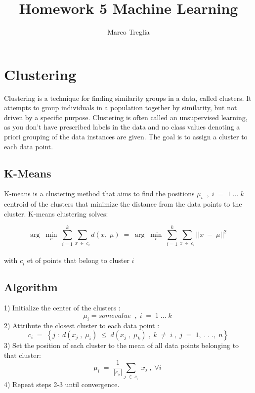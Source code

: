 \documentclass[11pt]{article}
\theoremstyle{plain}
\begin{document}
 



\title{Homework 5 Machine Learning}
\date{}
\author{Marco Treglia}
\maketitle

\section{Clustering }
Clustering is a technique for finding similarity groups in a data, called clusters. It attempts to group individuals in a population together by similarity, but not driven by a specific purpose. Clustering is often called an unsupervised learning, as you don’t have prescribed labels in the data and no class values denoting a priori grouping of the data instances are given.  The goal is to assign a cluster to each data point.
\\
\subsection{K-Means}
 K-means is a clustering method that aims to find the positions $\mu _{i}\; \; ,\; i\; =\; 1\; ...\; k\;  $ centroid of the clusters that minimize the distance from the data points to the cluster. K-means clustering solves:

$$ \arg \; \min _{c}\; \sum_{i=1}^{k}{\sum_{x\; \in \; c_{i}}^{}{d\left( x,\; \mu  \right)\; =\; }}\arg \; \min _{c}\; \sum_{i=1}^{k}{\sum_{x\; \in \; c_{i}}^{}{\left| \left| x\; -\; \mu  \right| \right|^{2}}}\;  $$  
 \\
 with $c_{i}^{}$ et of points that belong to cluster $i$
 \\
 \subsection*{Algorithm}

1) Initialize the center of the clusters : 
$$\mu _{i} = some value \; \; ,\; i\; =\; 1\; ...\; k\;  $$
2) Attribute the closest cluster to each data point : 
$$c_{i}\; =\; \left\{ j\; :\; d\left( x_{j}\; ,\; \mu _{i} \right)\; \leq \; d\left( x_{j}\; ,\; \mu _{k} \right)\; ,\; k\; \neq \; i\; ,\; j\; =\; 1,\; .\; .\; .,\; n \right\}$$
3) Set the position of each cluster to the mean of all data points belonging to that cluster:
$$ \mu _{i}\; =\; \frac{1}{\left| c_{i} \right|}\sum_{j\; \in \; c_{i}}^{}{\; x_{j}\; ,\;\forall i\; } $$
4) Repeat steps 2-3 until convergence.
\newpage
\end{document}
